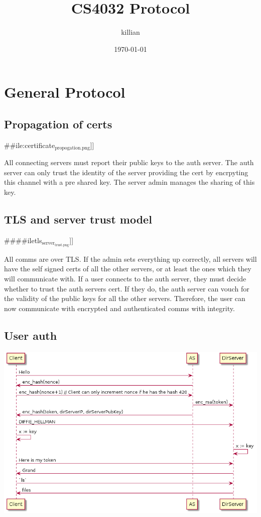 \documentclass[11pt]{article}
\author{killian}
\date{\today}
\title{CS4032 Protocol}
\begin{document}
\maketitle
\tableofcontents


\section{General Protocol}
\label{sec:org445e5cf}

\subsection{Propagation of certs}
\label{sec:orgb58201d}
\#\#ile:certificate\(_{\text{propogation.png}}\)]]

All connecting servers must report their public keys to the auth server. The auth server can only trust the identity of the server providing the cert by encrpyting this channel with a pre shared key.
The server admin manages the sharing of this key.


\subsection{TLS and server trust model}
\label{sec:orgc450b71}
\#\#\#\#iletls\(_{\text{server}}_{\text{trust.png}}\)]]

All comms are over TLS. If the admin sets everything up correctly, all servers will have the self signed certs of all the other servers, or at least the ones which they will communicate with.
If a user connects to the auth server, they must decide whether to trust the auth servers cert. If they do, the auth server can vouch for the validity of the public keys for all the other servers. Therefore,
the user can now communicate with encrypted and authenticated comms with integrity. 
\subsection{User auth}
\label{sec:org0f2d183}
\begin{center}
\includegraphics[width=.9\linewidth]{security.png}
\end{center}
\end{document}
